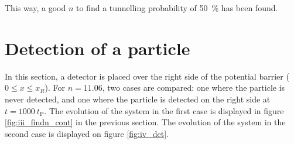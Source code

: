 \documentclass[a4paper,12pt,twoside]{article}
\begin{document}
      This way, a good $n$ to find a tunnelling probability of \SI{50}{\percent} has been found.


\newpage
\section{Detection of a particle}

In this section, a detector is placed over the right side of the potential barrier ($0\leq x \leq x_R$). For $n=11.06$, two cases are compared: one where the particle is never detected, and one where the particle is detected on the right side at $t=1000~t_\text{P}$. The evolution of the system in the first case is displayed in figure \ref{fig:iii_findn_cont} in the previous section. The evolution of the system in the second case is displayed on figure \ref{fig:iv_det}.
\end{document}
